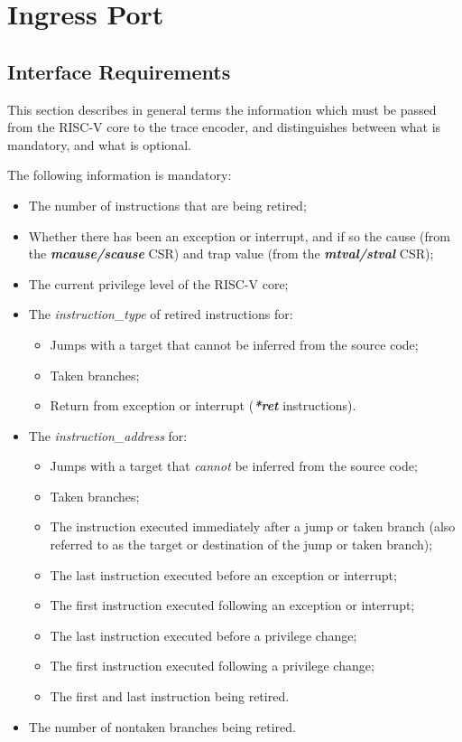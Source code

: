 \chapter{Ingress Port} \label{Interface}

\section{Interface Requirements}
This section describes in general terms the information which must be passed from the RISC-V core to the trace encoder,
and distinguishes between what is mandatory, and what is optional.

The following information is mandatory:

\begin{itemize}
  \item The number of instructions that are being retired;
  \item Whether there has been an exception or interrupt, and if so the cause (from the \textbf{\textit{mcause/scause}} CSR)
        and trap value (from the \textbf{\textit{mtval/stval}} CSR);
  \item The current privilege level of the RISC-V core;
  \item The \textit{instruction\_type} of retired instructions for:
    \begin{itemize}
      \item Jumps with a target that cannot be inferred from the source code;
      \item Taken branches;
      \item Return from exception or interrupt (\textbf{\textit{*ret}} instructions).
    \end{itemize}
  \item The \textit{instruction\_address} for:
    \begin{itemize}
      \item Jumps with a target that \textit{cannot} be inferred from the source code;
      \item Taken branches;
      \item The instruction executed immediately after a jump or taken branch (also referred to as the target or destination of the jump or taken branch);
      \item The last instruction executed before an exception or interrupt;
      \item The first instruction executed following an exception or interrupt;
      \item The last instruction executed before a privilege change;
      \item The first instruction executed following a privilege change;
      \item The first and last instruction being retired.
    \end{itemize}
  \item The number of nontaken branches being retired.
\end{itemize}

